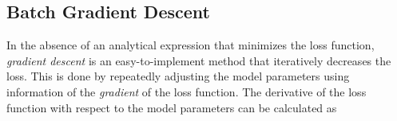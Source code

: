




\subsection{Batch Gradient Descent}\label{sec:GradientDescent}
In the absence of an analytical expression that minimizes the loss function, \emph{gradient descent} is an easy-to-implement method that iteratively decreases the loss. This is done by repeatedly adjusting the model parameters using information of the \emph{gradient} of the loss function. The derivative of the loss function with respect to the model parameters can be calculated as

